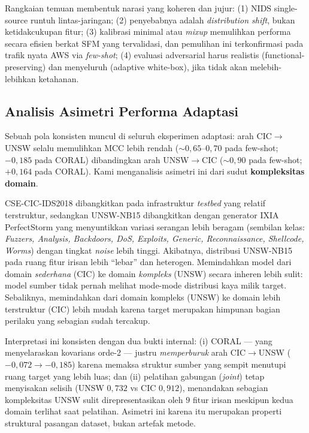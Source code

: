 \documentclass[11pt,a4paper]{article}
\begin{document}
Rangkaian temuan membentuk narasi yang koheren dan jujur:
(1) NIDS single-source runtuh lintas-jaringan;
(2) penyebabnya adalah \emph{distribution shift}, bukan ketidakcukupan fitur;
(3) kalibrasi minimal atau \emph{mixup} memulihkan performa secara efisien
berkat SFM yang tervalidasi, dan pemulihan ini terkonfirmasi pada trafik nyata
AWS via \emph{few-shot}\ifadversarial;
(4) evaluasi adversarial harus realistis (functional-preserving) dan
menyeluruh (adaptive white-box), jika tidak akan melebih-lebihkan ketahanan\fi.

\subsection{Analisis Asimetri Performa Adaptasi}
\label{sec:asymmetry}
Sebuah pola konsisten muncul di seluruh eksperimen adaptasi: arah
CIC$\rightarrow$UNSW selalu memulihkan MCC lebih rendah
($\sim 0{,}65$--$0{,}70$ pada few-shot; $-0{,}185$ pada CORAL) dibandingkan arah
UNSW$\rightarrow$CIC ($\sim 0{,}90$ pada few-shot; $+0{,}164$ pada CORAL). Kami
menganalisis asimetri ini dari sudut \textbf{kompleksitas domain}.

CSE-CIC-IDS2018 dibangkitkan pada infrastruktur \emph{testbed} yang relatif
terstruktur, sedangkan UNSW-NB15 dibangkitkan dengan generator IXIA
PerfectStorm yang menyuntikkan variasi serangan lebih beragam
(sembilan kelas: \emph{Fuzzers, Analysis, Backdoors, DoS, Exploits, Generic,
Reconnaissance, Shellcode, Worms}) dengan tingkat \emph{noise} lebih tinggi.
Akibatnya, distribusi UNSW-NB15 pada ruang fitur irisan lebih ``lebar'' dan
heterogen. Memindahkan model dari domain \emph{sederhana} (CIC) ke domain
\emph{kompleks} (UNSW) secara inheren lebih sulit: model sumber tidak pernah
melihat mode-mode distribusi kaya milik target. Sebaliknya, memindahkan dari
domain kompleks (UNSW) ke domain lebih terstruktur (CIC) lebih mudah karena
target merupakan himpunan bagian perilaku yang sebagian sudah tercakup.

Interpretasi ini konsisten dengan dua bukti internal: (i) CORAL --- yang
menyelaraskan kovarians orde-2 --- justru \emph{memperburuk} arah
CIC$\rightarrow$UNSW ($-0{,}072 \rightarrow -0{,}185$) karena memaksa struktur
sumber yang sempit menutupi ruang target yang lebih luas; dan (ii) pelatihan
gabungan (\emph{joint}) tetap menyisakan selisih (UNSW $0{,}732$ vs CIC $0{,}912$),
menandakan sebagian kompleksitas UNSW sulit direpresentasikan oleh $9$ fitur
irisan meskipun kedua domain terlihat saat pelatihan. Asimetri ini karena itu
merupakan properti struktural pasangan dataset, bukan artefak metode.
\end{document}
